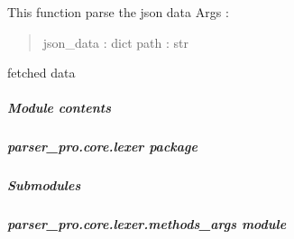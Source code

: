\documentclass[letterpaper,10pt,english]{sphinxmanual}
\begin{document}
\begin{fulllineitems}
\label{\detokenize{parser_pro.core.json_handler:parser_pro.core.json_handler.parser.parse}}
\pysigstartsignatures
{}
\pysigstopsignatures
\sphinxAtStartPar
This function parse the json data
Args :
\begin{quote}

\sphinxAtStartPar
json\_data : dict
path      : str
\end{quote}
\begin{description}
\sphinxAtStartPar
fetched data

\end{description}

\end{fulllineitems}



\subparagraph{Module contents}
\label{\detokenize{parser_pro.core.json_handler:module-parser_pro.core.json_handler}}\label{\detokenize{parser_pro.core.json_handler:module-contents}}
\sphinxstepscope


\subparagraph{parser\_pro.core.lexer package}
\label{\detokenize{parser_pro.core.lexer:parser-pro-core-lexer-package}}\label{\detokenize{parser_pro.core.lexer::doc}}

\subparagraph{Submodules}
\label{\detokenize{parser_pro.core.lexer:submodules}}

\subparagraph{parser\_pro.core.lexer.methods\_args module}
\label{\detokenize{parser_pro.core.lexer:module-parser_pro.core.lexer.methods_args}}\label{\detokenize{parser_pro.core.lexer:parser-pro-core-lexer-methods-args-module}}
\end{document}
